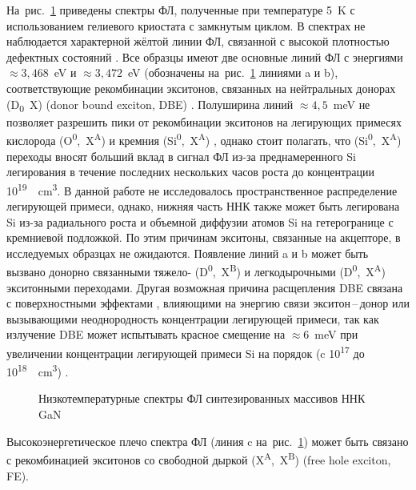 На~рис.~\cref{fig:Image_30_1} приведены спектры ФЛ, полученные при температуре
5~\si{\kelvin} с использованием гелиевого криостата с замкнутым циклом. В
спектрах не наблюдается характерной жёлтой линии ФЛ, связанной с высокой
плотностью дефектных состояний \cite{Suski1995}. Все образцы имеют две основные
линий ФЛ с энергиями \(\approx 3,468\)~\si{\electronvolt} и \(\approx
3,472\)~\si{\electronvolt} (обозначены на~рис.~\cref{fig:Image_30_1} линиями a
и b), соответствующие рекомбинации экситонов, связанных на нейтральных донорах
(D\textsubscript{0}~X) (donor bound exciton, DBE) \cite{Bolshakov2018,
Paskov2004}. Полуширина линий \(\approx 4,5\)~\si{\milli\electronvolt} не
позволяет разрешить пики от рекомбинации экситонов на легирующих примесях
кислорода (O\textsuperscript{0},~X\textsuperscript{A}) и кремния
(Si\textsuperscript{0},~X\textsuperscript{A}) \cite{Zettler2015}, однако стоит
полагать, что (Si\textsuperscript{0},~X\textsuperscript{A}) переходы вносят
больший вклад в сигнал ФЛ из-за преднамеренного Si легирования в течение
последних нескольких часов роста до концентрации
10\textsuperscript{19}~\si{\per\centi\metre\cubed}. В данной работе не
исследовалось пространственное распределение легирующей примеси, однако, нижняя
часть ННК также может быть легирована Si из-за радиального роста и объемной
диффузии атомов Si на гетерогранице с кремниевой подложкой. По этим причинам
экситоны, связанные на акцепторе, в исследуемых образцах не ожидаются.
Появление линий a и b может быть вызвано донорно связанными тяжело-
(D\textsuperscript{0},~X\textsuperscript{B}) и легкодырочными
(D\textsuperscript{0},~X\textsuperscript{A}) экситонными переходами. Другая
возможная причина расщепления DBE связана с поверхностными эффектами
\cite{Calarco2011}, влияющими на энергию связи экситон\,--\,донор или
вызывающими неоднородность концентрации легирующей примеси, так как излучение
DBE может испытывать красное смещение на \(\approx 6\)~\si{\milli\electronvolt}
при увеличении концентрации легирующей примеси Si на порядок (c
10\textsuperscript{17} до 10\textsuperscript{18}~\si{\per\centi\metre\cubed})
\cite{Pozina2011}.

\begin{figure}[ht]  \caption{Низкотемпературные
спектры ФЛ синтезированных массивов ННК GaN}\label{fig:Image_30_1} \end{figure}

Высокоэнергетическое плечо спектра ФЛ (линия c на~рис.~\cref{fig:Image_30_1})
может быть связано с рекомбинацией экситонов со свободной дыркой
(X\textsuperscript{A},~X\textsuperscript{B}) (free hole exciton, FE).

